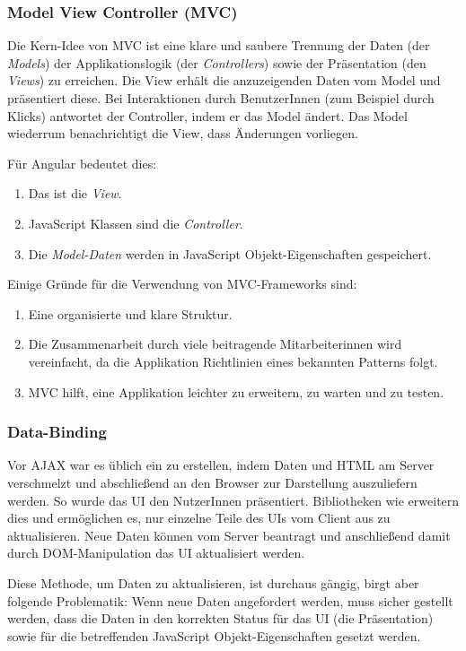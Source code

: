 \subsubsection{Model View Controller (MVC)}
Die Kern-Idee von MVC ist eine klare und saubere Trennung der Daten (der \textit{Models}) der Applikationslogik (der \textit{Controllers}) sowie der Präsentation (den \textit{Views}) zu erreichen. Die View erhält die anzuzeigenden Daten vom Model und präsentiert diese. Bei Interaktionen durch BenutzerInnen (zum Beispiel durch Klicks) antwortet der Controller, indem er das Model ändert. Das Model wiederrum benachrichtigt die View, dass Änderungen vorliegen.

Für Angular bedeutet dies:
\begin{enumerate}
  \item Das  ist die \textit{View}.
  \item JavaScript Klassen sind die \textit{Controller}.
  \item Die \textit{Model-Daten} werden in JavaScript Objekt-Eigenschaften gespeichert.
\end{enumerate}

Einige Gründe für die Verwendung von MVC-Frameworks sind:
\begin{enumerate}
  \item Eine organisierte und klare Struktur.
  \item Die Zusammenarbeit durch viele beitragende Mitarbeiterinnen wird vereinfacht, da die Applikation Richtlinien eines bekannten Patterns folgt.
  \item MVC hilft, eine Applikation leichter zu erweitern, zu warten und zu testen.
\end{enumerate}

\subsubsection{Data-Binding}
Vor AJAX war es üblich ein  zu erstellen, indem Daten und HTML am Server verschmelzt und abschließend an den Browser zur Darstellung auszuliefern werden. So wurde das UI den NutzerInnen präsentiert. Bibliotheken wie  erweitern dies und ermöglichen es, nur einzelne Teile des UIs vom Client aus zu aktualisieren. Neue Daten können vom Server beantragt und anschließend damit durch DOM-Manipulation das UI aktualisiert werden.

Diese Methode, um Daten zu aktualisieren, ist durchaus gängig, birgt aber folgende Problematik: Wenn neue Daten angefordert werden, muss sicher gestellt werden, dass die Daten in den korrekten Status für das UI (die Präsentation) sowie für die betreffenden JavaScript Objekt-Eigenschaften gesetzt werden.

